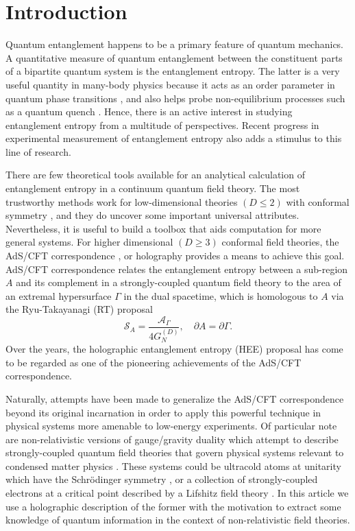 \documentclass[12pt,a4paper]{article}
\numberwithin{equation}{section}
\begin{document}
\section{Introduction} \label{intro}

Quantum entanglement happens to be a primary feature of quantum mechanics. A quantitative measure of quantum entanglement between the constituent parts of a bipartite quantum system is the entanglement entropy. The latter is a very useful quantity in many-body physics because it acts as an order parameter in quantum phase transitions \cite{Vidal:2002rm, Latorre:2003kg}, and also helps probe non-equilibrium processes such as a quantum quench \cite{Calabrese:2005in, Calabrese:2007mtj}. Hence, there is an active interest in studying entanglement entropy from a multitude of perspectives. Recent progress in experimental measurement of entanglement entropy \cite{Islam:2015mom} also adds a stimulus to this line of research. 

There are few theoretical tools available for an analytical calculation of entanglement entropy in a continuum quantum field theory. The most trustworthy methods work for low-dimensional theories $\left(D \leq 2 \right)$ with conformal symmetry \cite{Holzhey:1994we, Calabrese:2004eu, Calabrese:2009qy}, and they do uncover some important universal attributes. Nevertheless, it is useful to build a toolbox that aids computation for more general systems. For higher dimensional $\left(D \geq 3 \right)$ conformal field theories, the AdS/CFT correspondence \cite{Maldacena:1997re, Gubser:1998bc, Witten:1998qj}, or holography provides a means to achieve this goal. AdS/CFT correspondence relates the entanglement entropy between a sub-region $A$ and its complement in a strongly-coupled quantum field theory to the area of an extremal hypersurface $\Gamma$ in the dual spacetime, which is homologous to $A$ via the Ryu-Takayanagi (RT) proposal \cite{Ryu:2006bv, Ryu:2006ef, Hubeny:2007xt}
%
\begin{equation}\label{RT_formula}
	\mathcal{S}_{A} = \frac{\mathcal{A}_{\Gamma}}{4 G_N^{(D)}}, \quad \partial A = \partial \Gamma.
\end{equation}
%
Over the years, the holographic entanglement entropy (HEE) proposal has come to be regarded as one of the pioneering achievements of the AdS/CFT correspondence. 

Naturally, attempts have been made to generalize the AdS/CFT correspondence beyond its original incarnation in order to apply this powerful technique in physical systems more amenable to low-energy experiments. Of particular note are non-relativistic versions of gauge/gravity duality which attempt to describe strongly-coupled quantum field theories that govern physical systems relevant to condensed matter physics \cite{Son:2008ye, Balasubramanian:2008dm, Kachru:2008yh}. These systems could be ultracold atoms at unitarity which have the Schr\"{o}dinger symmetry \cite{Mehen:1999nd}, or a collection of strongly-coupled electrons at a critical point described by a Lifshitz field theory \cite{PhysRevLett.35.1678, PhysRevB.23.4615}. In this article we use a holographic description of the former with the motivation to extract some knowledge of quantum information in the context of non-relativistic field theories.
\end{document}
